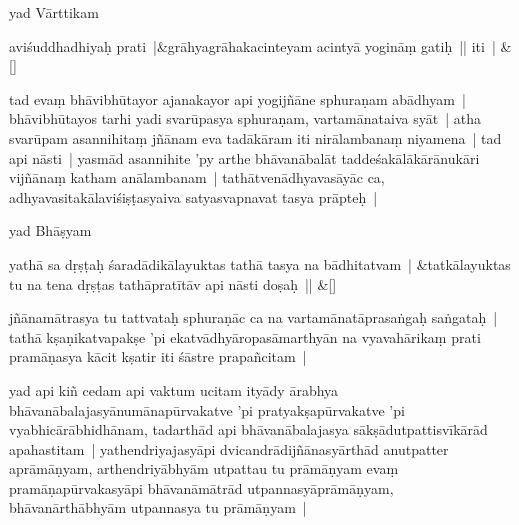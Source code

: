 \documentclass[article,12pt,a4paper]{memoir}%
\newcommand{\name}[1]{#1}
\newcounter{parCount}
\begin{document}
	  
	  \pstart \leavevmode%
	\label{thakur75-22.1}yad Vārttikam 
	{}
	\pend%
      
	    
	    \stanza[\smallbreak]
	  aviśuddhadhiyaḥ prati |&grāhyagrāhakacinteyam acintyā yogināṃ gatiḥ || iti | \&[\smallbreak]
	  
	  
	  

	  
	  \pstart \leavevmode%
	\label{thakur75-22.4}tad evaṃ bhāvibhūtayor ajanakayor api yogijñāne sphuraṇam abādhyam | bhāvibhūtayos tarhi yadi svarūpasya sphuraṇam, vartamānataiva syāt | atha svarūpam asannihitaṃ jñānam eva tadākāram iti nirālambanaṃ niyamena | tad api nāsti | yasmād asannihite 'py arthe bhāvanābalāt taddeśakālākārānukāri vijñānaṃ katham anālambanam | tathātvenādhyavasāyāc ca, adhyavasitakālaviśiṣṭasyaiva satyasvapnavat tasya prāpteḥ | 
	{}
	\pend%
      

	  
	  \pstart \leavevmode%
	yad \name{Bhāṣyam}
	{}
	\pend%
      
	    
	    \stanza[\smallbreak]
	  yathā sa dṛṣṭaḥ śaradādikālayuktas tathā tasya na bādhitatvam | &tatkālayuktas tu na tena dṛṣṭas tathāpratītāv api nāsti doṣaḥ || \&[\smallbreak]
	  
	  
	  

	  
	  \pstart \leavevmode%
	jñānamātrasya tu tattvataḥ sphuraṇāc ca na vartamānatāprasaṅgaḥ saṅgataḥ | tathā kṣaṇikatvapakṣe 'pi ekatvādhyāropasāmarthyān na vyavahārikaṃ prati pramāṇasya kācit kṣatir iti śāstre prapañcitam | 
	{}
	\pend%
      

	  
	  \pstart \leavevmode%
	\label{thakur75-22.17}yad api kiñ cedam api vaktum ucitam ityādy ārabhya bhāvanābalajasyānumānapūrvakatve 'pi pratyakṣapūrvakatve 'pi vyabhicārābhidhānam, tadarthād api bhāvanābalajasya sākṣādutpattisvīkārād apahastitam | yathendriyajasyāpi dvicandrādijñānasyārthād anutpatter aprāmāṇyam, arthendriyābhyām utpattau tu prāmāṇyam evaṃ pramāṇapūrvakasyāpi bhāvanāmātrād utpannasyāprāmāṇyam, bhāvanārthābhyām utpannasya tu prāmāṇyam | 
	{}
	\pend%
      
\end{document}
